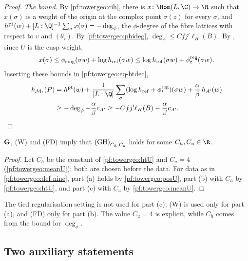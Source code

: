 \begin{proof}
\emph{The bound.} By \cref{pf:towergeo:cih}, there is
$x\colon\Hom(L,\C)\to\R$ such that $x(\sigma)$ is a weight of the origin at the complex point $\sigma(z)$ for
every $\sigma$, and $h^{\mathrm{pt}}(w)+[L:\Q]^{-1}\sum_\sigma x(\sigma)=-\deg_\phi$, the $\phi$-degree of the fibre
lattices with respect to $v$ and $(\theta_\tau)$. By \cref{pf:towergeo:phideg}, $\deg_\phi\le Cfj'\ell_H(B)$. By
, since $U$ is the cusp weight,
\[
x(\sigma)\le\phi_{\mathrm{sing}}(\sigma w)+\log h_{\mathrm{ref}}(\sigma w)
\le\log h_{\mathrm{ref}}(\sigma w)+\phi^{\mathrm{reg}}_t(\sigma w).
\]
Inserting these bounds in \eqref{pf:towergeo:eq-htdec},
\begin{align*}
h_{\mathcal M_t}(P)&=h^{\mathrm{pt}}(w)+\frac1{[L:\Q]}\sum_\sigma(\log h_{\mathrm{ref}}+\towergeoreg_t)(\sigma w)
+\frac\alpha\beta\,h_{A'}(w)\\
&\ge-\deg_\phi-\frac\alpha\beta c_{A'}\ge-Cfj'\ell_H(B)-\frac\alpha\beta c_{A'}.\qedhere
\end{align*}
\end{proof}

\begin{theorem}\label{pf:towergeo:nine}
$\mathbf G$, \textup{(W)} and \textup{(FD)} imply that $\textup{(GH)}_{C_h,C_u}$ holds for some
$C_h,C_u\in\R$.
\end{theorem}

\begin{proof}
Let $C_h$ be the constant of \cref{pf:towergeo:htU} and $C_u=4$ (\cref{pf:towergeo:meanU}); both are chosen
before the data. For data as in \cref{pf:towergeo:def-nine}, part (a) holds by \cref{pf:towergeo:posU},
part (b) with $C_h$ by \cref{pf:towergeo:htU}, and part (c) with $C_u$ by \cref{pf:towergeo:meanU}.
\end{proof}

\begin{remark}\label{pf:towergeo:rem-nine}
The tied regularisation setting is not used for part (c); (W) is used only for part (a), and (FD) only for
part (b). The value $C_u=4$ is explicit, while $C_h$ comes from the bound for $\deg_\phi$.
\end{remark}

\subsection{Two auxiliary statements}\label{pf:towergeo:sec-aux}


